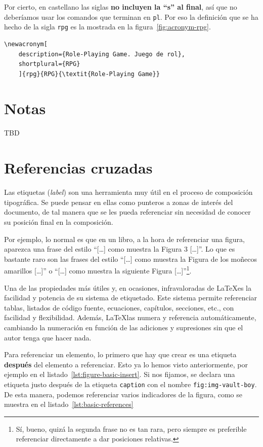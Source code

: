 Por cierto, en castellano las siglas \textbf{no incluyen la \enquote{s} al final}, así que no deberíamos usar los comandos que terminan en \texttt{pl}. Por eso la definición que se ha hecho de la sigla \texttt{rpg} es la mostrada en la figura~\ref{fig:acronym-rpg}.

\begin{lstlisting}[language={[latex]TeX},caption=Entrada de \texttt{rpg} en \texttt{glossaries.tex},label=fig:acronym-rpg]
\newacronym[
    description={Role-Playing Game. Juego de rol},
    shortplural={RPG}
    ]{rpg}{RPG}{\textit{Role-Playing Game}}
\end{lstlisting}

\section{Notas}

TBD

\section{Referencias cruzadas}
\label{s:crossref}

Las etiquetas (\textit{label}) son una herramienta muy útil en el proceso de composición tipográfica. Se puede pensar en ellas como punteros a zonas de interés del documento, de tal manera que se les pueda referenciar sin necesidad de conocer su posición final en la composición.

Por ejemplo, lo normal es que en un libro, a la hora de referenciar una figura, aparezca una frase del estilo ``[\ldots] como muestra la Figura 3 [\ldots]''. Lo que es bastante raro son las frases del estilo ``[\ldots] como muestra la Figura de los moñecos amarillos [\ldots]'' o ``[\ldots] como muestra la siguiente Figura [\ldots]''\footnote{Sí, bueno, quizá la segunda frase no es tan rara, pero siempre es preferible referenciar directamente a dar posiciones relativas.}.

Una de las propiedades más útiles y, en ocasiones, infravaloradas de \LaTeX es la facilidad y potencia de su sistema de etiquetado. Este sistema permite referenciar tablas, listados de código fuente, ecuaciones, capítulos, secciones, etc., con facilidad y flexibilidad. Además, \LaTeX las numera y referencia automáticamente, cambiando la numeración en función de las adiciones y supresiones sin que el autor tenga que hacer nada.

Para referenciar un elemento, lo primero que hay que crear es una etiqueta \textbf{después} del elemento a referenciar. Esto ya lo hemos visto anteriormente, por ejemplo en el listado~\ref{lst:figure-basic-insert}. Si nos fijamos, se declara una etiqueta justo después de la etiqueta \texttt{caption} con el nombre \texttt{fig:img-vault-boy}. De esta manera, podemos referenciar varios indicadores de la figura, como se muestra en el listado~\ref{lst:basic-references}

